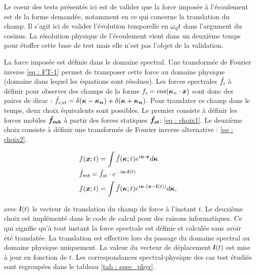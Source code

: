 Le coeur des tests présentés ici est de valider que la force imposée à l'écoulement est de la forme demandée, notamment en ce qui concerne la translation du champ. Il s'agit ici de valider l'évolution temporelle en $\o_q t$ dans l'argument du cosinus. La résolution physique de l'écoulement vient dans un deuxième temps pour étoffer cette base de test mais elle n'est pas l'objet de la validation.

La force imposée est définie dans le domaine spectral. Une transformée de Fourier inverse \ref{eq : FT-1} permet de transposer cette force au domaine physique (domaine dans lequel les équations sont résolues). Les forces spectrales $\hf_i$ à définir pour observer des champs de la forme $f_i=cos(\bm{\k}_n \cdot \bm{x})$ sont donc des paires de dirac : $\hf_{i;st} = \d(\bm{\k}-\bm{\k_n}) + \d(\bm{\k}+\bm{\k_n})$. Pour translater ce champ dans le temps, deux choix équivalents sont possibles. Le premier consiste à définir les forces mobiles $\bm{\hf_{mb}}$ à partir des forces statiques $\bm{\hf_{st}} $: \ref{eq : choix1}. Le deuxième choix consiste à définir une transformée de Fourier inverse alternative : \ref{eq : choix2}.

\begin{align}
&f(\bm{x};t) = \int \hf(\bm{\k};t) e^{i \bm{\k \cdot x} } d\bm{\k}
\label{eq : FT-1} \\
&\hf_{mb} = \hf_{st} \cdot e^{-i \bk \cdot \bl(t)}
\label{eq : choix1} \\
&f(\bm{x};t) = \int \hf(\bm{\k};t) e^{i {\bk \cdot (\bx - \bl(t))} } d\bm{\k},
\label{eq : choix2}
\end{align}

avec $\bl(t)$ le vecteur de translation du champ de force à l'instant $t$. Le deuxième choix est implémenté dans le code de calcul pour des raisons informatiques. Ce qui signifie qu'à tout instant la force spectrale est définie et calculée sans avoir été translatée. La translation est effective lors du passage du domaine spectral au domaine physique uniquement. La valeur du vecteur de déplacement $\bl(t)$ est mise à jour en fonction de $t$. Les correspondances spectral-physique des cas test étudiés sont regroupées dans le tableau \ref{tab : spec_phys}.

